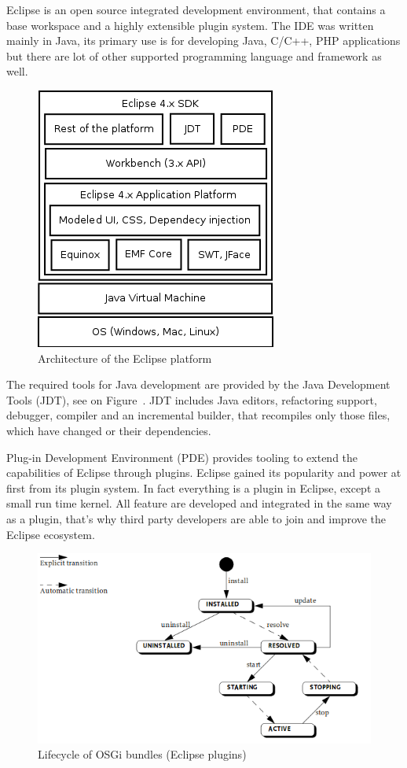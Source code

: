 Eclipse is an open source integrated development environment, that contains a base workspace and a highly extensible plugin system. The IDE was written mainly in Java, its primary use is for developing Java, C/C++, PHP applications but there are lot of other supported programming language and framework as well.

\begin{figure}[htp]
\centering
\includegraphics[scale=0.5]{figures/design_eclipse.png}
\caption{Architecture of the Eclipse platform}
\label{fig:designeclipse}
\end{figure}

The required tools for Java development are provided by the Java Development Tools (JDT), see on Figure~\cite{fig:designeclipse}. JDT includes Java editors, refactoring support, debugger, compiler and an incremental builder, that recompiles only those files, which have changed or their dependencies.

Plug-in Development Environment (PDE) provides tooling to extend the capabilities of Eclipse through plugins. Eclipse gained its popularity and power at first from its plugin system. In fact everything is a plugin in Eclipse, except a small run time kernel. All feature are developed and integrated in the same way as a plugin, that's why third party developers are able to join and improve the Eclipse ecosystem.

\begin{figure}[htp]
\centering
\includegraphics[scale=0.5]{figures/design_osgi.png}
\caption{Lifecycle of OSGi bundles (Eclipse plugins)}
\label{fig:designosgi}
\end{figure}


